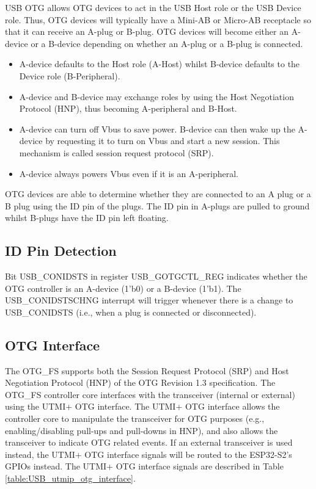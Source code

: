 \documentclass[main\_\_EN.tex]{subfiles}
\begin{document}
USB OTG allows OTG devices to act in the USB Host role or the USB Device role. Thus, OTG devices will typically have a Mini-AB or Micro-AB receptacle so that it can receive an A-plug or B-plug. OTG devices will become either an A-device or a B-device depending on whether an A-plug or a B-plug is connected.

\begin{itemize}
    \item A-device defaults to the Host role (A-Host) whilst B-device defaults to the Device role (B-Peripheral).
    \item A-device and B-device may exchange roles by using the Host Negotiation Protocol (HNP), thus becoming A-peripheral and B-Host.
    \item A-device can turn off Vbus to save power. B-device can then wake up the A-device by requesting it to turn on Vbus and start a new session. This mechanism is called session request protocol (SRP).
    \item A-device always powers Vbus even if it is an A-peripheral.
\end{itemize}

OTG devices are able to determine whether they are connected to an A plug or a B plug using the ID pin of the plugs. The ID pin in A-plugs are pulled to ground whilst B-plugs have the ID pin left floating.

\subsection{ID Pin Detection}

Bit USB\_CONIDSTS in register USB\_GOTGCTL\_REG indicates whether the OTG controller is an A-device (1'b0) or a B-device (1'b1). The USB\_CONIDSTSCHNG interrupt will trigger whenever there is a change to USB\_CONIDSTS (i.e., when a plug is connected or disconnected).

\subsection{OTG Interface}

The OTG\_FS supports both the Session Request Protocol (SRP) and Host Negotiation Protocol (HNP) of the OTG Revision 1.3 specification. The OTG\_FS controller core interfaces with the transceiver (internal or external) using the UTMI+ OTG interface. The UTMI+ OTG interface allows the controller core to manipulate the transceiver for OTG purposes (e.g., enabling/disabling pull-ups and pull-downs in HNP), and also allows the transceiver to indicate OTG related events. If an external transceiver is used instead, the UTMI+ OTG interface signals will be routed to the ESP32-S2's GPIOs instead. The UTMI+ OTG interface signals are described in Table \ref{table:USB_utmip_otg_interface}.
\end{document}

